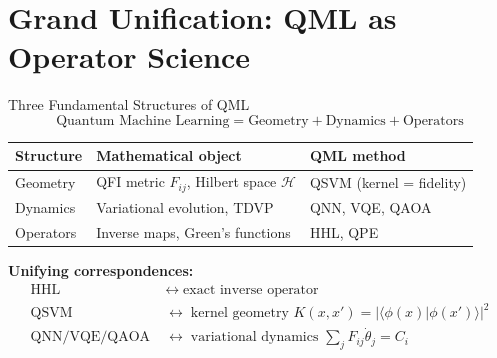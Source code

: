 \documentclass[aspectratio=169,10pt]{beamer}
\begin{document}
\section{Grand Unification: QML as Operator Science}

\begin{frame}{Three Fundamental Structures of QML}
  \[
    \boxed{
      \text{Quantum Machine Learning}
      = \text{Geometry} + \text{Dynamics} + \text{Operators}
    }
  \]
  \vspace{0.2cm}
  \begin{center}
  \renewcommand{\arraystretch}{1.3}
  \begin{tabular}{p{2.4cm}p{4.2cm}p{4.0cm}}
    \toprule
    \textbf{Structure} & \textbf{Mathematical object} & \textbf{QML method} \\
    \midrule
    Geometry  & QFI metric $F_{ij}$, Hilbert space $\mathcal{H}$
              & QSVM (kernel = fidelity) \\
    Dynamics  & Variational evolution, TDVP
              & QNN, VQE, QAOA \\
    Operators & Inverse maps, Green's functions
              & HHL, QPE \\
    \bottomrule
  \end{tabular}
  \end{center}

  \vspace{0.3cm}
  \textbf{Unifying correspondences:}
  \begin{align*}
    \text{HHL} &\;\longleftrightarrow\; \text{exact inverse operator}\\
    \text{QSVM} &\;\longleftrightarrow\; \text{kernel geometry }
      K(x,x')=|\langle\phi(x)|\phi(x')\rangle|^2\\
    \text{QNN/VQE/QAOA} &\;\longleftrightarrow\; \text{variational dynamics }
      \textstyle\sum_j F_{ij}\dot\theta_j = C_i
  \end{align*}
\end{frame}
\end{document}
